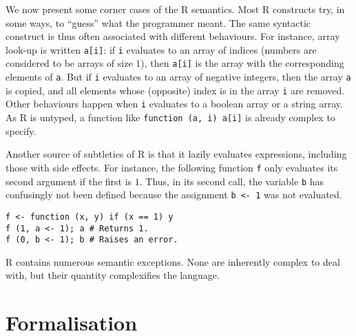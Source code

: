 \documentclass[9pt, sigplan, natbib=false, screen=true]{acmart}
\newcommand\R{R}
\begin{document}
We now present some corner cases of the \R{} semantics.
Most \R{} constructs
try, in some ways, to ``guess'' what the programmer meant.
The same syntactic construct is thus often associated
with different behaviours.
For instance, array look-up is written \texttt{a[i]}:
if \texttt{i} evaluates to an array of indices
(numbers are considered to be arrays of size \(1\)),
then \texttt{a[i]} is the array with
the corresponding elements of \texttt{a}.
But if \texttt{i} evaluates to an array of negative integers,
then the array \texttt{a} is copied,
and all elements whose (opposite) index is in the array \texttt{i}
are removed.
Other behaviours happen when \texttt{i}
evaluates to a boolean array or a string array.
As \R{} is untyped,
a function like \texttt{function (a, i) a[i]}
is already complex to specify.

Another source of subtleties of \R{} is that it lazily evaluates expressions,
including those with side effects.
For instance, the following function \texttt{f}
only evaluates its second argument if the first is \(1\).
Thus, in its second call, the variable \texttt{b}
has confusingly not been defined because the assignment \texttt{b <- 1}
was not evaluated.
\begin{verbatim}
f <- function (x, y) if (x == 1) y
f (1, a <- 1); a # Returns 1.
f (0, b <- 1); b # Raises an error.
\end{verbatim}

\R{} contains numerous semantic exceptions. %
None are inherently complex to deal with,
but their quantity complexifies the language.


\section{Formalisation}
\label{sec:formalisation}
\end{document}
